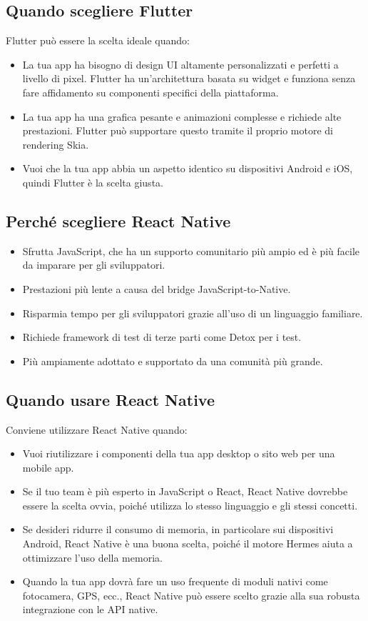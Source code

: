 \documentclass[a4paper,10pt]{article}
\begin{document}
\subsection{Quando scegliere Flutter}
Flutter può essere la scelta ideale quando:
\begin{itemize}
    \item La tua app ha bisogno di design UI altamente personalizzati e perfetti a livello di pixel. Flutter ha un'architettura basata su widget e funziona senza fare affidamento su componenti specifici della piattaforma.
    \item La tua app ha una grafica pesante e animazioni complesse e richiede alte prestazioni. Flutter può supportare questo tramite il proprio motore di rendering Skia.
    \item Vuoi che la tua app abbia un aspetto identico su dispositivi Android e iOS, quindi Flutter è la scelta giusta.
\end{itemize}

\subsection{Perché scegliere React Native}
\begin{itemize}
    \item Sfrutta JavaScript, che ha un supporto comunitario più ampio ed è più facile da imparare per gli sviluppatori.
    \item Prestazioni più lente a causa del bridge JavaScript-to-Native.
    \item Risparmia tempo per gli sviluppatori grazie all'uso di un linguaggio familiare.
    \item Richiede framework di test di terze parti come Detox per i test.
    \item Più ampiamente adottato e supportato da una comunità più grande.
\end{itemize}

\subsection{Quando usare React Native}
Conviene utilizzare React Native quando:
\begin{itemize}
    \item Vuoi riutilizzare i componenti della tua app desktop o sito web per una mobile app.
    \item Se il tuo team è più esperto in JavaScript o React, React Native dovrebbe essere la scelta ovvia, poiché utilizza lo stesso linguaggio e gli stessi concetti.
    \item Se desideri ridurre il consumo di memoria, in particolare sui dispositivi Android, React Native è una buona scelta, poiché il motore Hermes aiuta a ottimizzare l'uso della memoria.
    \item Quando la tua app dovrà fare un uso frequente di moduli nativi come fotocamera, GPS, ecc., React Native può essere scelto grazie alla sua robusta integrazione con le API native.
\end{itemize}
\end{document}
